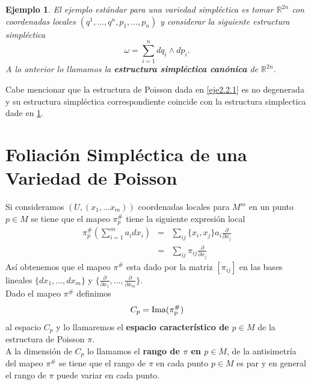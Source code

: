 \documentclass[a4paper,10pt]{book}
\newtheorem{eje}{Ejemplo}[chapter]
\begin{document}
\begin{eje}\label{ejeSim}
El ejemplo est\'andar para una variedad simpl\'ectica es tomar $\mathbb{R}^{2n}$ con coordenadas locales $(q^{1},...,q^{n},p_{1},...,p_{n})$ y considerar la siguiente estructura simpl\'ectica  
\begin{equation}
\omega=\sum_{i=1}^{n}d q_{i}\wedge d p_{i}.
\end{equation}
A lo anterior lo llamamos la {\bfseries estructura simpl\'ectica can\'onica} de $\mathbb{R}^{2n}$.  
\end{eje}

Cabe mencionar que la estructura de Poisson dada en \ref{eje2.2.1} es no degenerada y su estructura simpl\'ectica correspondiente coincide con la estructura simplectica dade en \ref{ejeSim}.

\section{Foliaci\'on Simpl\'ectica de una Variedad de Poisson}\label{2.3}

Si consideramos $(U,(x_{1},...x_{m}))$ coordenadas locales para $M^{m}$ en un punto $p\in M$ se tiene que el mapeo $\pi^{\#}_{p}$ tiene la siguiente expresi\'on local 
\begin{eqnarray*}
\pi_{p}^{\#}(\sum_{i=1}^{m}a_{i}dx_{i}) & = & \sum_{ij}\{x_{i},x_{j}\}a_{i}\frac{\partial}{\partial x_{j}}\\
                                        & = & \sum_{ij}\pi_{ij}\frac{\partial}{\partial x_{j}} 
\end{eqnarray*}
As\'i obtenemos que el mapeo $\pi^{\#}$ esta dado por la matriz $[\pi_{ij}]$ en las bases lineales $\{dx_{1},...,dx_{m}\}$ y $\{\frac{\partial}{\partial x_{1}},...,\frac{\partial}{\partial x_{m}}\}$.\\

Dado el mapeo $\pi^{\#}$ definimos
\begin{equation}\label{EqEspaCarac}
C_{p}={\rm Ima(\pi^{\#}_{p})}
\end{equation}
al espacio $C_{p}$ y lo llamaremos el {\bfseries espacio caracter\'istico de $p\in M$} de la estructura de Poisson $\pi$. \\

A la dimensi\'on de $C_{p}$ lo llamamos el {\bfseries rango de $\pi$ en $p\in M$}, de la antisimetr\'ia del mapeo $\pi^{\#}$ se tiene que el rango de $\pi$ en cada punto $p\in M$ es par y en general el rango de $\pi$ puede variar en cada punto.\\
\end{document}
